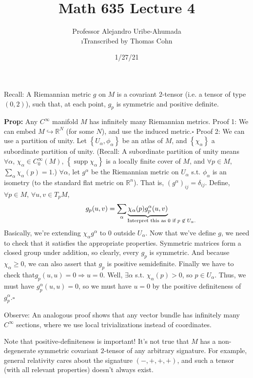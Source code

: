 \documentclass[10pt,letterpaper]{article}
\author{Professor Alejandro Uribe-Ahumada\\ \small\i{Transcribed by Thomas Cohn}}
\title{Math 635 Lecture 4}
\date{1/27/21} %
\newcommand{\n}{\hfill\break}
\newcommand{\nn}{\vspace{0.5\baselineskip}\n}
\newcommand{\up}{\vspace{-\baselineskip}}
\newcommand{\hangblock}[2]{\par\noindent\settowidth{\hangindent}{\textbf{#1: }}\textbf{#1: }\nolinebreak#2}
\newcommand{\prop}[1]{\hangblock{Prop}{#1}}
\newcommand{\proven}{\;$\square$\n}
\newcommand{\ptxt}[1]{\textrm{\textnormal{#1}}}
\newcommand{\set}[1]{\left\{#1\right\}}
\newcommand{\reals}{\mathbb{R}}
\newcommand{\R}{\reals}
\DeclareMathOperator{\supp}{supp}
\newcommand{\st}{s.t.}
\begin{document}
\maketitle
\setlength\RaggedRightParindent{\parindent}
\RaggedRight

\par\noindent
Recall: A Riemannian metric $g$ on $M$ is a covariant $2$-tensor (i.e. a tensor of type $(0,2)$), such that, at each point, $g_{p}$ is symmetric and positive definite.\n

\prop{
	Any $C^{\infty}$ manifold $M$ has infinitely many Riemannian metrics.\nn
	Proof 1: We can embed $M\hookrightarrow\R^{N}$ (for some $N$), and use the induced metric.\proven\up\nn
	Proof 2: We can use a partition of unity. Let $\set{U_{\alpha},\phi_{\alpha}}$ be an atlas of $M$, and $\set{\chi_{\alpha}}$ a subordinate partition of unity. (Recall: A subordinate partition of unity means $\forall\alpha$, $\chi_{\alpha}\in{}C^{\infty}_{0}(M)$, $\set{\supp\chi_{\alpha}}$ is a locally finite cover of $M$, and $\forall{}p\in{}M$, $\sum_{\alpha}\chi_{\alpha}(p)=1$.) $\forall\alpha$, let $g^{\alpha}$ be the Riemannian metric on $U_{\alpha}$ \st{} $\phi_{\alpha}$ is an isometry (to the standard flat metric on $\R^{n}$). That is, $(g^{\alpha})_{ij}=\delta_{ij}$. Define, $\forall{}p\in{}M$, $\forall{}u,v\in{}T_{p}M$,
	\[
		g_{p}(u,v)=\sum_{\alpha}\underbrace{\chi_{\alpha}(p)g_{p}^{\alpha}(u,v)}_{\hspace{-60pt}\mathrlap{\ptxt{Interpret this as $0$ if $p\not\in{}U_{\alpha}$.}}}
	\]
	Basically, we're extending $\chi_{\alpha}g^{\alpha}$ to $0$ outside $U_{\alpha}$. Now that we've define $g$, we need to check that it satisfies the appropriate properties. Symmetric matrices form a closed group under addition, so clearly, every $g_{p}$ is symmetric. And because $\chi_{\alpha}\ge{}0$, we can also assert that $g_{p}$ is positive semidefinite. Finally we have to check that\break $g_{p}(u,u)=0\Rightarrow{}u=0$. Well, $\exists\alpha$ \st{} $\chi_{\alpha}(p)>0$, so $p\in{}U_{\alpha}$. Thus, we must have $g_{p}^{\alpha}(u,u)=0$, so we must have $u=0$ by the positive definiteness of $g_{p}^{\alpha}$.\proven
}

\par\noindent
Observe: An analogous proof shows that any vector bundle has infinitely many $C^{\infty}$ sections, where we use local trivializations instead of coordinates.\n

\par\noindent
Note that positive-definiteness is important! It's not true that $M$ has a non-degenerate symmetric covariant $2$-tensor of any arbitrary signature. For example, general relativity cares about the signature $(-,+,+,+)$, and such a tensor (with all relevant properties) doesn't always exist.\n
\end{document}

